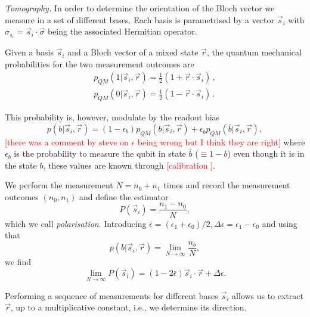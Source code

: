 \documentclass[two column]{article}
\newcommand{\caro}[1]{\textcolor{red}{[#1]}}
\begin{document}
\emph{Tomography.} In order to determine the orientation of the Bloch vector we measure in a set of different bases. Each basis is parametrised by a vector $\vec{s}_i$ with $\sigma_{s_i} = \vec{s}_i \cdot \vec{\sigma}$ being the associated Hermitian operator.

Given a basis $\vec{s}_i$ and a Bloch vector of a mixed state $\vec{r}$, the quantum mechanical probabilities for the two measurement outcomes are
\begin{equation}\label{eqn:probs}
\begin{split}
p_{QM}(1|\vec{s}_i, \vec{r}) = \frac{1}{2}(1+\vec{r}\cdot\vec{s}_i)\,,\\
p_{QM}(0|\vec{s}_i, \vec{r}) = \frac{1}{2}(1-\vec{r}\cdot\vec{s}_i)\,.
\end{split}
\end{equation}

This probability is, however, modulate by the readout bias
\begin{equation}
    p(b|\vec{s}_i, \vec{r}) = (1-\epsilon_b)p_{QM}(b|\vec{s}_i, \vec{r}) + \epsilon_{\bar{b}} p_{QM}(\bar{b}|\vec{s}_i, \vec{r}), \label{eqn:marg}
\end{equation}
\caro{there was a comment by steve on $\epsilon$ being wrong but I think they are right}
where $\epsilon_b$ is the probability to measure the qubit in state $\bar{b}$ ($\equiv 1-b$) even though it is in the state $b$, these values are known through \caro{calibration \cite{}}.


We perform the measurement $N=n_0 + n_1$ times and record the measurement outcomes $(n_0, n_1)$ and define the estimator 
\begin{equation}
    P(\vec{s}_i) = \frac{n_1-n_0}{N},
\end{equation}
which we call \emph{polarisation}.
Introducing $\bar \epsilon = (\epsilon_1+\epsilon_0)/2, \Delta \epsilon = \epsilon_1-\epsilon_0$ and using that 
$$p(b|\vec{s}_i, \vec{r})=\lim_{N\to \infty} \frac{n_b}{N},$$
we find \begin{equation}
\lim_{N \to \infty} P(\vec{s}_i)=(1-2\bar\epsilon)\vec{s}_i \cdot \vec{r} + \Delta\epsilon.\label{eqn:estim}
\end{equation}
 
Performing a sequence of measurements for different bases $\vec{s}_i$ allows us to extract $\vec{r}$, up to a multiplicative constant, i.e., we determine its direction.
\end{document}
